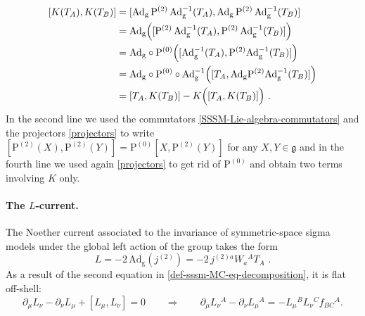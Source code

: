 \documentclass[12pt]{article}
\numberwithin{equation}{section}
\begin{document}
\begin{equation}
\begin{aligned}
[K(T_{A}),K(T_{B})]&=[\mathrm{Ad}_{\mathrm{g}} \, \mathrm{P}^{(2)} \, \mathrm{Ad}_{\mathrm{g}}^{-1}(T_{A}),\mathrm{Ad}_{\mathrm{g}} \, \mathrm{P}^{(2)} \, \mathrm{Ad}_{\mathrm{g}}^{-1}(T_{B})]
\\
&=\mathrm{Ad}_{\mathrm{g}}\Bigl([\mathrm{P}^{(2)} \, \mathrm{Ad}_{\mathrm{g}}^{-1}(T_{A}),\mathrm{P}^{(2)} \, \mathrm{Ad}_{\mathrm{g}}^{-1}(T_{B})] \Bigr)
\\
&= \mathrm{Ad}_{\mathrm{g}} \circ \mathrm{P}^{(0)} \Bigl( [\mathrm{Ad}_{\mathrm{g}}^{-1}(T_{A}),\mathrm{P}^{(2)}\mathrm{Ad}_{\mathrm{g}}^{-1}(T_{B})]\Bigr)
\\
&= \mathrm{Ad}_{\mathrm{g}} \circ \mathrm{P}^{(0)} \circ \mathrm{Ad}_{\mathrm{g}}^{-1} \Bigl( [T_{A},\mathrm{Ad}_{\mathrm{g}} \mathrm{P}^{(2)}\mathrm{Ad}_{\mathrm{g}}^{-1}(T_{B})]\Bigr)
\\
&=[T_{A},K(T_{B})]-K\Bigl([T_{A},K(T_{B})] \Bigr) \,\, .
\end{aligned}
\end{equation}
In the second line we used the commutators \eqref{SSSM-Lie-algebra-commutators} and the projectors \eqref{projectors} to write $[\mathrm{P}^{(2)}(X),\mathrm{P}^{(2)}(Y)]=\mathrm{P}^{(0)}[X,\mathrm{P}^{(2)}(Y)]$ for any $X,Y \in \mathfrak{g}$ and in the fourth line we used again \eqref{projectors} to get rid of $\mathrm{P}^{(0)} $ and obtain two terms involving $K$ only.


\paragraph{The $L$-current.} The Noether current associated to the invariance of symmetric-space sigma models under the global left action of the group takes the form
\begin{equation}\label{SSSM-J-definition}
L = -2 \, \mathrm{Ad}_{\mathrm{g}}(j^{(2)}) = -2 \, j^{(2)a}W_{a}{}^{A}T_{A} \,\, .
\end{equation}
As a result of the second equation in \eqref{def-sssm-MC-eq-decomposition}, it is flat off-shell:
\begin{equation}\label{SSSM-J-flat}
\partial_{\mu}L_{\nu}-\partial_{\nu}L_{\mu}+[L_{\mu},L_{\nu}]=0  \qquad \Longrightarrow \qquad \partial_{\mu}L_{\nu}{}^{A}-\partial_{\nu}L_{\mu}{}^{A}=-L_{\mu}{}^{B}L_{\nu}{}^{C}f_{BC}{}^{A} .
\end{equation}
\end{document}
